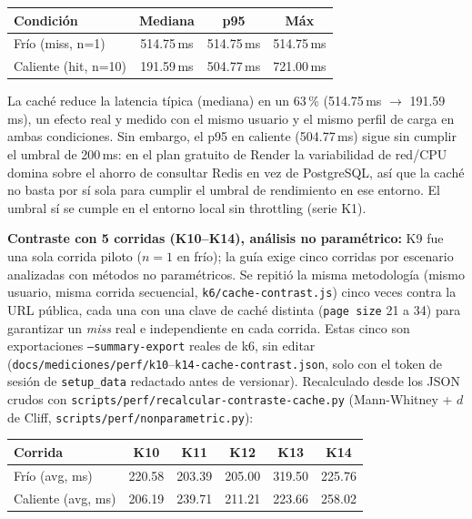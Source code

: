 \begin{center}
\begin{tabular}{@{}lccc@{}}
\toprule
Condición & Mediana & p95 & Máx \\
\midrule
Frío (miss, n=1) & 514.75\,ms & 514.75\,ms & 514.75\,ms \\
Caliente (hit, n=10) & 191.59\,ms & 504.77\,ms & 721.00\,ms \\
\bottomrule
\end{tabular}
\end{center}

La caché reduce la latencia típica (mediana) en un 63\,\% (514.75\,ms
$\rightarrow$ 191.59\,ms), un efecto real y medido con el mismo usuario y el
mismo perfil de carga en ambas condiciones. Sin embargo, el p95 en caliente
(504.77\,ms) sigue sin cumplir el umbral de 200\,ms: en el plan gratuito de
Render la variabilidad de red/CPU domina sobre el ahorro de consultar Redis
en vez de PostgreSQL, así que la caché no basta por sí sola para cumplir el
umbral de rendimiento en ese entorno. El umbral sí se cumple en el entorno
local sin throttling (serie K1).

\textbf{Contraste con 5 corridas (K10--K14), análisis no paramétrico:}
K9 fue una sola corrida piloto ($n=1$ en frío); la guía exige cinco
corridas por escenario analizadas con métodos no paramétricos. Se
repitió la misma metodología (mismo usuario, misma corrida secuencial,
\texttt{k6/cache-contrast.js}) cinco veces contra la URL pública, cada
una con una clave de caché distinta (\texttt{page size} 21 a 34) para
garantizar un \emph{miss} real e independiente en cada corrida. Estas
cinco son exportaciones \texttt{--summary-export} reales de k6, sin
editar (\texttt{docs/mediciones/perf/k10}--\texttt{k14-cache-contrast.json},
solo con el token de sesión de \texttt{setup\_data} redactado antes de
versionar). Recalculado desde los JSON crudos con
\texttt{scripts/perf/recalcular-contraste-cache.py}
(Mann-Whitney + $d$ de Cliff, \texttt{scripts/perf/nonparametric.py}):

\begin{center}
\begin{tabular}{@{}lccccc@{}}
\toprule
Corrida & K10 & K11 & K12 & K13 & K14 \\
\midrule
Frío (avg, ms) & 220.58 & 203.39 & 205.00 & 319.50 & 225.76 \\
Caliente (avg, ms) & 206.19 & 239.71 & 211.21 & 223.66 & 258.02 \\
\bottomrule
\end{tabular}
\end{center}

